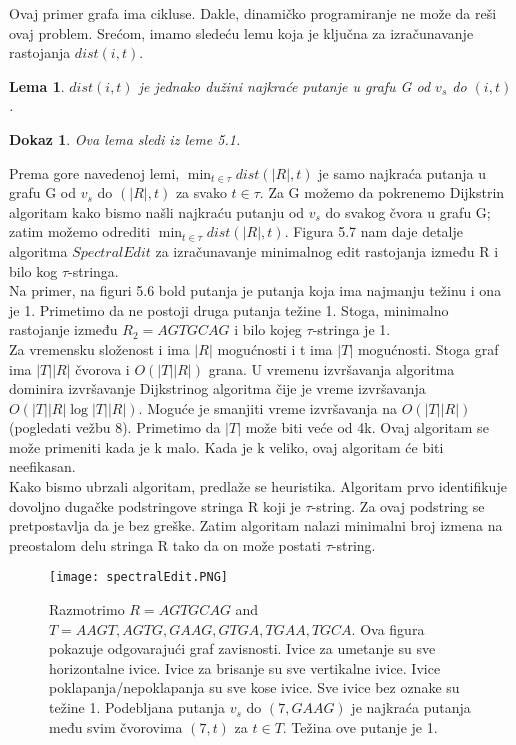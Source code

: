 \documentclass{article}
\newtheorem{lema}{Lema}
\newtheorem{dokaz}{Dokaz}
\begin{document}
Ovaj primer grafa ima cikluse. Dakle, dinamičko programiranje ne može da reši ovaj problem. Srećom, imamo sledeću lemu koja je ključna za izračunavanje rastojanja $dist(i, t)$.

\begin{lema} {$dist(i, t)$ je jednako dužini najkraće putanje u grafu G od $v_s$ do $(i, t)$.}
\end{lema}

\begin{dokaz} {Ova lema sledi iz leme 5.1.}
\end{dokaz}

Prema gore navedenoj lemi, $\min_{t \in \tau} dist(\vert R\rvert, t)$ je samo najkraća putanja u grafu G od $v_s$ do $(\vert R\rvert, t)$ za svako $t \in \tau$. Za G možemo da pokrenemo Dijkstrin algoritam kako bismo našli najkraću putanju od $v_s$ do svakog čvora u grafu G; zatim možemo odrediti $\min_{t \in \tau} dist(\vert R\rvert, t)$. Figura 5.7 nam daje detalje algoritma $SpectralEdit$ za izračunavanje minimalnog edit rastojanja između R i bilo kog $\tau$-stringa.\\

Na primer, na figuri 5.6 bold putanja je putanja koja ima najmanju težinu i ona je 1. Primetimo da ne postoji druga putanja težine 1. Stoga, minimalno rastojanje između $R_2= AGTGCAG$ i bilo kojeg $\tau$-stringa je 1.\\

Za vremensku složenost i ima $|R|$ mogućnosti i t ima $|T|$ mogućnosti. Stoga graf ima $|T||R|$ čvorova i $O(|T||R|)$ grana. U vremenu izvršavanja algoritma dominira izvršavanje Dijkstrinog algoritma čije je vreme izvršavanja $O(|T||R| \log{|T||R|})$. Moguće je smanjiti vreme izvršavanja na $O(|T||R|)$ (pogledati vežbu 8). Primetimo da $|T|$ može biti veće od 4k. Ovaj algoritam se može primeniti kada je k malo. Kada je k veliko, ovaj algoritam će biti neefikasan.\\

Kako bismo ubrzali algoritam, predlaže se heuristika. Algoritam prvo identifikuje dovoljno dugačke podstringove stringa R koji je $\tau$-string. Za ovaj podstring se pretpostavlja da je bez greške. Zatim algoritam nalazi minimalni broj izmena na preostalom delu stringa R tako da on može postati $\tau$-string. 

\begin{figure}[h]
\centering
\texttt{[image: spectralEdit.PNG]}
\caption{Razmotrimo $R = AGTGCAG$ and $T = {AAGT, AGTG, GAAG, GTGA, TGAA, TGCA}$. Ova figura pokazuje odgovarajući graf zavisnosti. Ivice za umetanje su sve horizontalne ivice. Ivice za brisanje su sve vertikalne ivice. Ivice poklapanja/nepoklapanja su sve kose ivice. Sve ivice bez oznake su težine 1. Podebljana putanja $v_s$ do $(7, GAAG)$ je najkraća putanja među svim čvorovima $(7, t)$ za $t \in T$. Težina ove putanje je 1.}
\end{figure}
\end{document}
